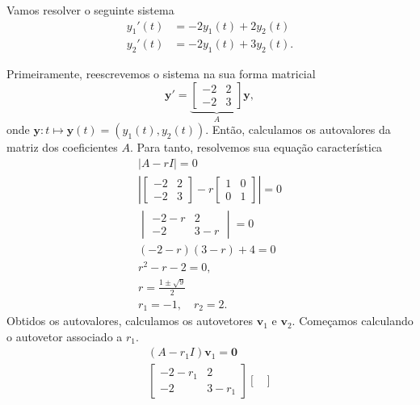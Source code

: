 \begin{ex}\label{ex:edosis1_eqh_avd}
  Vamos resolver o seguinte sistema
  \begin{align}\label{eq:ex_edosis1_eqh_avd}
    y_1'(t) &= -2y_1(t) + 2y_2(t) \\
    y_2'(t) &= -2y_1(t) + 3y_2(t).
  \end{align}

  Primeiramente, reescrevemos o sistema na sua forma matricial
  \begin{equation}
    \pmb{y}' =
    \underbrace{\begin{bmatrix}
      -2 & 2 \\
      -2 & 3
    \end{bmatrix}}_{A}
    \pmb{y},
  \end{equation}
  onde $\pmb{y}: t\mapsto \pmb{y}(t) = (y_1(t), y_2(t))$. Então, calculamos os autovalores da matriz dos coeficientes $A$. Para tanto, resolvemos sua equação característica
  \begin{gather}
    |A-rI| = 0 \\
    \left|
      \begin{bmatrix}
        -2 & 2 \\
        -2 & 3
      \end{bmatrix}
      -r
      \begin{bmatrix}
        1 & 0 \\
        0 & 1
      \end{bmatrix}
    \right| = 0 \\
    \begin{vmatrix}
      -2 - r & 2 \\
      -2 & 3 - r
    \end{vmatrix} = 0 \\
    (-2-r)(3-r) + 4 = 0 \\
    r^2 - r - 2 =  0,\\
    r = \frac{1 \pm \sqrt{9}}{2} \\
    r_1=-1,\quad r_2=2.
  \end{gather}
  Obtidos os autovalores, calculamos os autovetores $\pmb{v}_1$ e $\pmb{v}_2$. Começamos calculando o autovetor associado a $r_1$.
  \begin{gather}
    (A-r_1I)\pmb{v}_1 = \pmb{0} \\
    \begin{bmatrix}
      -2-r_1 & 2 \\
      -2 & 3-r_1
    \end{bmatrix}
    \begin{bmatrix}

\end{bmatrix}
\end{gather}
\end{ex}
